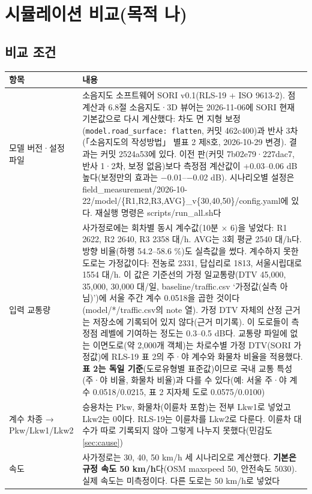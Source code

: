 \documentclass[10.5pt,a4paper]{article}
\newcommand{\hd}[1]{\cellcolor{headfill}\textbf{\sffamily #1}}
\begin{document}
\clearpage\section{시뮬레이션 비교(목적 나)}
\subsection{비교 조건}
\footnotesize
\begin{longtable}{L{0.24}L{0.76}}
\toprule
\hd{항목} & \hd{내용} \\ \midrule
\endhead
\bottomrule
\endlastfoot
모델 버전·설정 파일 & 소음지도 소프트웨어 SORI v0.1(RLS-19 + ISO 9613-2). 점 계산과 6.8절 소음지도·3D 뷰어는 2026-11-06에 SORI 현재 기본값으로 다시 계산했다: 차도 면 지형 보정(\texttt{model.road\_surface: flatten}, 커밋 462c400)과 반사 3차(「소음지도의 작성방법」 별표 2 제8호, 2026-10-29 변경). 결과는 커밋 2524a53에 있다. 이전 판(커밋 7b02e79·227dac7, 반사 1·2차, 보정 없음)보다 측정점 계산값이 +0.03--0.06 dB 높다(보정만의 효과는 $-$0.01--$-$0.02 dB). 시나리오별 설정은 field\_measurement/2026-10-22/model/\{R1,R2,R3,AVG\}\_v\{30,40,50\}/config.yaml에 있다. 재실행 명령은 scripts/run\_all.sh다 \\ \midrule
입력 교통량 & 사가정로에는 회차별 동시 계수값(10분 $\times$ 6)을 넣었다: R1 2622, R2 2640, R3 2358 대/h. AVG는 3회 평균 2540 대/h다. 방향 비율(하행 54.2--58.6 \%)도 실측값을 썼다. 계수하지 못한 도로는 가정값이다: 전농로 2331, 답십리로 1813, 서울시립대로 1554 대/h. 이 값은 기준선의 가정 일교통량(DTV 45,000, 35,000, 30,000 대/일, baseline/traffic.csv `가정값(실측 아님)')에 서울 주간 계수 0.0518을 곱한 것이다(model/*/traffic.csv의 note 열). 가정 DTV 자체의 산정 근거는 저장소에 기록되어 있지 않다(근거 미기록). 이 도로들이 측정점 레벨에 기여하는 정도는 0.3--0.5 dB다. 교통량 파일에 없는 이면도로(약 2,000개 객체)는 차로수별 가정 DTV(SORI 가정값)에 RLS-19 표 2의 주·야 계수와 화물차 비율을 적용했다. \textbf{표 2는 독일 기준}(도로유형별 표준값)이므로 국내 교통 특성(주·야 비율, 화물차 비율)과 다를 수 있다(예: 서울 주·야 계수 0.0518/0.0215, 표 2 지자체 도로 0.0575/0.0100) \\ \midrule
계수 차종 → Pkw/Lkw1/Lkw2 & 승용차는 Pkw, 화물차(이륜차 포함)는 전부 Lkw1로 넣었고 Lkw2는 0이다. RLS-19는 이륜차를 Lkw2로 다룬다. 이륜차 대수가 따로 기록되지 않아 그렇게 나누지 못했다(민감도 \ref{sec:cause}) \\ \midrule
속도 & 사가정로는 30, 40, 50 km/h 세 시나리오로 계산했다. \textbf{기본은 규정 속도 50 km/h}다(OSM maxspeed 50, 안전속도 5030). 실제 속도는 미측정이다. 다른 도로는 50 km/h로 넣었다 \\ \midrule

\end{longtable}
\end{document}
